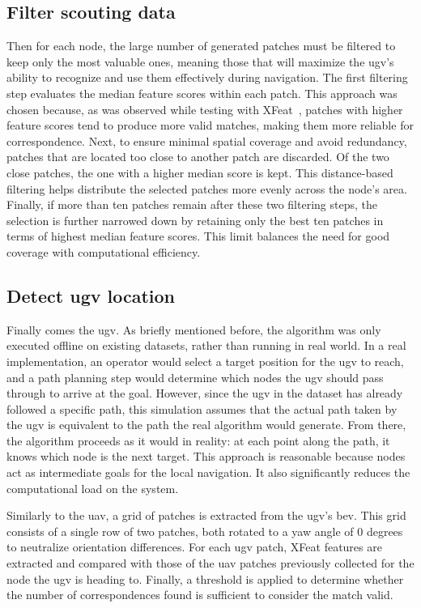 \subsection{Filter scouting data}

Then for each node, the large number of generated patches must be filtered to keep only the most valuable
ones, meaning those that will maximize the \gls{ugv}’s ability to recognize and use them effectively during navigation.
The first filtering step evaluates the median feature scores within each patch.
This approach was chosen because, as was observed while testing with XFeat~\cite{potje_xfeat_2024}, patches with higher
feature scores tend to produce more valid matches, making them more reliable for correspondence.
Next, to ensure minimal spatial coverage and avoid redundancy, patches that are located too close to another patch are discarded.
Of the two close patches, the one with a higher median score is kept.
This distance-based filtering helps distribute the selected patches more evenly across the node’s area.
Finally, if more than ten patches remain after these two filtering steps, the selection is further narrowed down
by retaining only the best ten patches in terms of highest median feature scores.
This limit balances the need for good coverage with computational efficiency.

\subsection{Detect \gls{ugv} location}


Finally comes the \gls{ugv}.
As briefly mentioned before, the algorithm was only executed offline on existing datasets, rather than running in real world.
In a real implementation, an operator would select a target position for the \gls{ugv} to reach, and a path planning step
would determine which nodes the \gls{ugv} should pass through to arrive at the goal.
However, since the \gls{ugv} in the dataset has already followed a specific path, this simulation assumes that the actual
path taken by the \gls{ugv} is equivalent to the path the real algorithm would generate.
From there, the algorithm proceeds as it would in reality: at each point along the path, it knows which node is the next target.
This approach is reasonable because nodes act as intermediate goals for the local navigation.
It also significantly reduces the computational load on the system.

Similarly to the \gls{uav}, a grid of patches is extracted from the \gls{ugv}'s \gls{bev}.
This grid consists of a single row of two patches, both rotated to a yaw angle of 0 degrees to neutralize orientation differences.
For each \gls{ugv} patch, XFeat features are extracted and compared with those of the \gls{uav} patches previously
collected for the node the \gls{ugv} is heading to.
Finally, a threshold is applied to determine whether the number of correspondences found is sufficient to consider the match valid.



